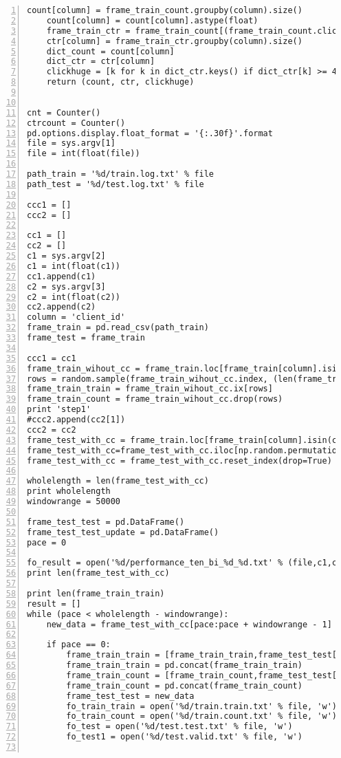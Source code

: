 \begin{lstlisting}[numbers=left, breaklines=true]
    count[column] = frame_train_count.groupby(column).size()
    count[column] = count[column].astype(float)
    frame_train_ctr = frame_train_count[(frame_train_count.click_count == 1)]
    ctr[column] = frame_train_ctr.groupby(column).size()
    dict_count = count[column]
    dict_ctr = ctr[column]
    clickhuge = [k for k in dict_ctr.keys() if dict_ctr[k] >= 400]
    return (count, ctr, clickhuge)


cnt = Counter()
ctrcount = Counter()
pd.options.display.float_format = '{:.30f}'.format
file = sys.argv[1]
file = int(float(file))

path_train = '%d/train.log.txt' % file
path_test = '%d/test.log.txt' % file

ccc1 = []
ccc2 = []

cc1 = []
cc2 = []
c1 = sys.argv[2]
c1 = int(float(c1))
cc1.append(c1)
c2 = sys.argv[3]
c2 = int(float(c2))
cc2.append(c2)
column = 'client_id'
frame_train = pd.read_csv(path_train)
frame_test = frame_train

ccc1 = cc1
frame_train_wihout_cc = frame_train.loc[frame_train[column].isin(ccc1)]
rows = random.sample(frame_train_wihout_cc.index, (len(frame_train_wihout_cc.index) / 3))
frame_train_train = frame_train_wihout_cc.ix[rows]
frame_train_count = frame_train_wihout_cc.drop(rows)
print 'step1'
#ccc2.append(cc2[1])
ccc2 = cc2
frame_test_with_cc = frame_train.loc[frame_train[column].isin(ccc2)]
frame_test_with_cc=frame_test_with_cc.iloc[np.random.permutation(len(frame_test_with_cc))]
frame_test_with_cc = frame_test_with_cc.reset_index(drop=True)

wholelength = len(frame_test_with_cc)
print wholelength
windowrange = 50000

frame_test_test = pd.DataFrame()
frame_test_test_update = pd.DataFrame()
pace = 0

fo_result = open('%d/performance_ten_bi_%d_%d.txt' % (file,c1,c2), 'w')
print len(frame_test_with_cc)
    
print len(frame_train_train)
result = []
while (pace < wholelength - windowrange):
    new_data = frame_test_with_cc[pace:pace + windowrange - 1]
    
    if pace == 0:
        frame_train_train = [frame_train_train,frame_test_test[:windowrange/3]]
        frame_train_train = pd.concat(frame_train_train)
        frame_train_count = [frame_train_count,frame_test_test[(windowrange/3)+1:]]
        frame_train_count = pd.concat(frame_train_count)
        frame_test_test = new_data
        fo_train_train = open('%d/train.train.txt' % file, 'w')
        fo_train_count = open('%d/train.count.txt' % file, 'w')
        fo_test = open('%d/test.test.txt' % file, 'w')
        fo_test1 = open('%d/test.valid.txt' % file, 'w')


\end{lstlisting}
